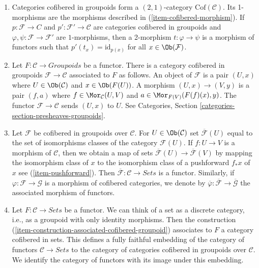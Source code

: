 \begin{remarks}
\begin{enumerate}
\item
\label{item-definition-cofibered-groupoids-2-category}
Categories cofibered in groupoids form a $(2, 1)$-category
$\text{Cof}(\mathcal{C})$. Its 1-morphisms are the morphisms described in
(\ref{item-cofibered-morphism}). If $p : \mathcal{F} \to C$ and
$p': \mathcal{F}' \to \mathcal{C}$ are categories cofibered in groupoids
and $\varphi, \psi : \mathcal{F} \to \mathcal{F}'$ are $1$-morphisms, then
a 2-morphism $t : \varphi \to \psi$ is a morphism of functors such that
$p'(t_x) = \text{id}_{p(x)}$ for all $x \in \Ob(\mathcal{F})$.
\item
\label{item-construction-associated-cofibered-groupoid}
Let $F : \mathcal{C} \to \textit{Groupoids}$ be a functor. There
is a category cofibered in groupoids $\mathcal{F} \to \mathcal{C}$
associated to $F$ as follows. An object of $\mathcal{F}$ is a pair $(U, x)$
where $U \in \Ob(\mathcal{C})$ and $x \in \Ob(F(U))$. A
morphism $(U, x) \to (V, y)$ is a pair $(f, a)$ where
$f \in \Mor_\mathcal{C}(U, V)$ and
$a \in \Mor_{F(V)}(F(f)(x), y)$.
The functor $\mathcal{F} \to \mathcal{C}$ sends $(U, x)$ to $U$. See
Categories, Section \ref{categories-section-presheaves-groupoids}.
\item
\label{item-associated-functor-isomorphism-classes}
Let $\mathcal{F}$ be cofibered in groupoids over $\mathcal{C}$.
For $U \in \Ob(\mathcal{C})$ set $\overline{\mathcal{F}}(U)$ equal to
the set of isomorphisms classes of the category $\mathcal{F}(U)$.
If $f : U \to V$ is a morphism of $\mathcal{C}$, then we obtain a
map of sets $\overline{\mathcal{F}}(U) \to \overline{\mathcal{F}}(V)$ by
mapping the isomorphism class of $x$ to the isomorphism class of a pushforward
$f_*x$ of $x$ see (\ref{item-pushforward}). Then
$\overline{\mathcal{F}} : \mathcal{C} \to \textit{Sets}$ is a
functor. Similarly, if $\varphi : \mathcal{F} \to \mathcal{G}$ is a
morphism of cofibered categories, we denote by
$\overline{\varphi}: \overline{\mathcal{F}} \to  \overline{\mathcal{G}}$
the associated morphism of functors.
\item
\label{item-convention-cofibered-sets}
Let $F: \mathcal{C} \to \textit{Sets}$ be a functor. We can think of a
set as a discrete category, i.e., as a groupoid with only identity morphisms.
Then the construction (\ref{item-construction-associated-cofibered-groupoid})
associates to $F$ a category cofibered in sets. This defines a fully
faithful embedding of the category of functors $\mathcal{C} \to \textit{Sets}$
to the category of categories cofibered in groupoids over $\mathcal{C}$.
We identify the category of functors with its image under this embedding.

\end{enumerate}
\end{remarks}
